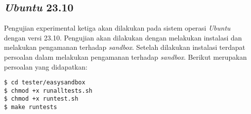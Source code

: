 \subsection{\textit{Ubuntu} 23.10}
Pengujian experimental ketiga akan dilakukan pada sistem operasi \textit{Ubuntu} dengan versi 23.10. Pengujian akan dilakukan dengan melakukan instalasi dan melakukan pengamanan terhadap \textit{sandbox}. Setelah dilakukan instalasi terdapat persoalan dalam melakukan pengamanan terhadap \textit{sandbox}. Berikut merupakan persoalan yang didapatkan:
\begin{lstlisting}[caption=Pembangunan \textit{sandbox} pada \textit{Ubuntu} 23.10, label=kode:sandbox2310]
$ cd tester/easysandbox
$ chmod +x runalltests.sh
$ chmod +x runtest.sh
$ make runtests
\end{lstlisting}


